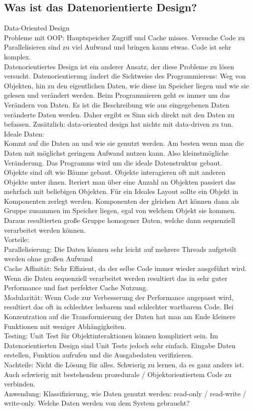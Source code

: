 \documentclass[12pt, titlepage]{article}
\begin{document}
\subsection{Was ist das Datenorientierte Design?}
Data-Oriented Design \cite{Data-OrientedDesign}\\
Probleme mit OOP: Hauptspeicher Zugriff und Cache misses. Versuche Code zu Parallelisieren sind zu viel Aufwand und bringen kaum etwas. Code ist sehr komplex.\\Datenorientiertes Design ist ein anderer Ansatz, der diese Probleme zu lösen versucht. Datenorientierung ändert die Sichtweise des Programmierens: Weg von Objekten, hin zu den eigentlichen Daten, wie diese im Speicher liegen und wie sie gelesen und verändert werden. Beim Programmieren geht es immer um das Verändern von Daten. Es ist die Beschreibung wie aus eingegebenen Daten veränderte Daten werden. Daher ergibt es Sinn sich direkt mit den Daten zu befassen. Zusätzlich: \glqq data-oriented design\grqq{}  hat nichts mit \glqq data-driven\grqq{} zu tun.\\ Ideale Daten:\\Kommt auf die Daten an und wie sie genutzt werden. Am besten wenn man die Daten mit möglichst geringem Aufwand nutzen kann. Also kleinstmögliche Veränderung. Das Programms wird um die ideale Datenstruktur gebaut.\\Objekte sind oft wie Bäume gebaut. Objekte interagieren oft mit anderen Objekte \glqq unter\grqq{} ihnen. Iteriert man über eine Anzahl an Objekten passiert das mehrfach mit beliebigen Objekten. Für ein Ideales Layout sollte ein Objekt in Komponenten zerlegt werden. Komponenten der gleichen Art können dann als Gruppe zusammen im Speicher liegen, egal von welchem Objekt sie kommen. Daraus resultierten große Gruppe homogener Daten, welche dann sequenziell verarbeitet werden können.\\Vorteile:\\Parallelisierung: Die Daten können sehr leicht auf mehrere Threads aufgeteilt werden ohne großen Aufwand\\Cache Affinität: Sehr Effizient, da der selbe Code immer wieder ausgeführt wird. Wenn die Daten sequenziell verarbeitet werden resultiert das in sehr guter Performance und fast perfekter Cache Nutzung.\\Modularität: Wenn Code zur Verbesserung der Performance angepasst wird, resultiert das oft in schlechter lesbarem und schlechter wartbarem Code. Bei Konzentration auf die Transformierung der Daten hat man am Ende kleinere Funktionen mit weniger Abhängigkeiten.\\Testing: Unit Test für Objektinteraktionen können kompliziert sein. Im Datenorientierten Design sind Unit Tests jedoch sehr einfach. Eingabe Daten erstellen, Funktion aufrufen und die Ausgabedaten verifizieren.\\Nachteile: Nicht die Lösung für alles. Schwierig zu lernen, da es ganz anders ist. Auch schwierig mit bestehendem prozedurale / Objektorientiertem Code zu verbinden.\\Anwendung: Klassifizierung, wie Daten genutzt werden: read-only / read-write / write-only. Welche Daten werden von dem System gebraucht? 
\end{document}
